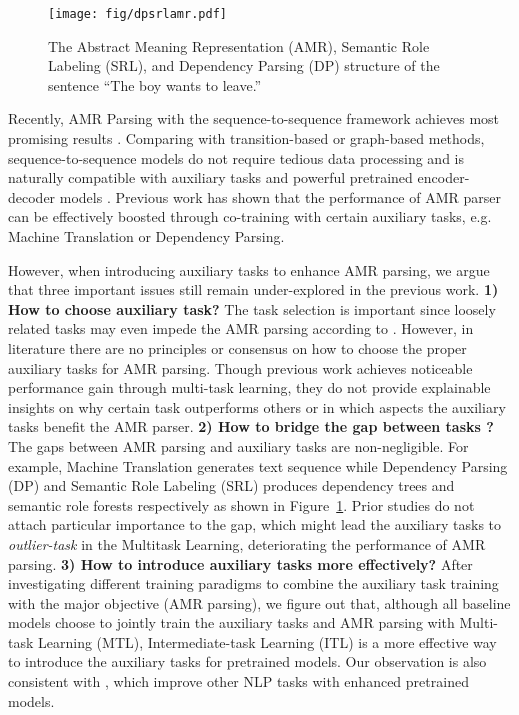 \documentclass[11pt]{article}
\begin{document}
\begin{figure}[t]
    \centering
    \texttt{[image: fig/dpsrlamr.pdf]}
    \caption{The Abstract Meaning Representation (AMR), Semantic Role Labeling (SRL), and Dependency Parsing (DP)  structure of the sentence ``The boy wants to leave.''}
    \label{fig:srl_dp_amr}
\end{figure}





Recently, AMR Parsing with the sequence-to-sequence framework achieves most promising results \citep{xu-seqpretrain,bevil-spring}. Comparing with transition-based or graph-based methods, sequence-to-sequence models do not require tedious data processing and is naturally compatible with auxiliary tasks \citep{xu-seqpretrain} and powerful pretrained encoder-decoder models \citep{bevil-spring}. Previous work \citep{xu-seqpretrain,Wu2021ImprovingAP} has shown that the performance of AMR parser can be effectively boosted through co-training with certain auxiliary tasks, e.g. Machine Translation or Dependency Parsing. 

However, when introducing auxiliary tasks to enhance AMR parsing, we argue that three important issues still remain under-explored in the previous work. \textbf{1) How to choose auxiliary task?} The task selection is important since loosely related tasks may even impede the AMR parsing according to \citet{Damonte2021OneSP}. However, in literature there are no principles or consensus on how to choose the proper auxiliary tasks for AMR parsing. Though previous work achieves noticeable performance gain through multi-task learning, they do not provide explainable insights on why certain task outperforms others or in which aspects the auxiliary tasks benefit the AMR parser.
\textbf{2) How to bridge the gap between tasks ?} The gaps between AMR parsing and auxiliary tasks are non-negligible. For example, Machine Translation generates text sequence while Dependency Parsing (DP) and Semantic Role Labeling (SRL) produces dependency trees and semantic role forests respectively as shown in Figure~\ref{fig:srl_dp_amr}. Prior studies \citep{xu-seqpretrain,Wu2021ImprovingAP,Damonte2021OneSP} do not attach particular importance to the gap, which might lead the auxiliary tasks to \textit{outlier-task} \citep{multi-sy,cai_will_2017} in the Multitask Learning, deteriorating the performance of AMR parsing. 
\textbf{3) How to introduce auxiliary tasks more effectively?} After investigating different training paradigms to combine the auxiliary task training with the major objective (AMR parsing), we figure out that, although all baseline models     \citep{xu-seqpretrain,Wu2021ImprovingAP,Damonte2021OneSP} choose to jointly train the auxiliary tasks and AMR parsing with Multi-task Learning (MTL), Intermediate-task Learning (ITL) is a more effective way to introduce the auxiliary tasks for pretrained models. Our observation is also consistent with \citep{kun2020intermediate,poth2021intermediate}, which improve other NLP tasks with enhanced pretrained models.
\end{document}
